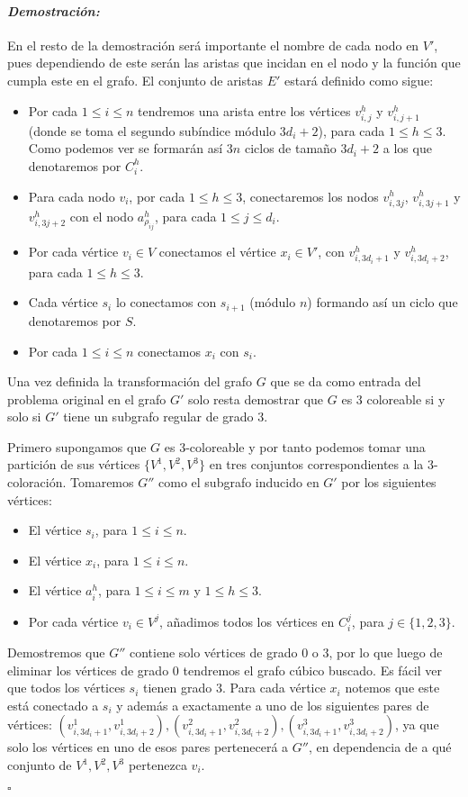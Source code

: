 \documentclass[10pt]{amsart}
\theoremstyle{definition}
\numberwithin{equation}{section}
\newenvironment{myproof} {\paragraph{\emph{Demostraci\'on:}}}{\hfill$\square$}
\begin{document}
\begin{myproof}
	En el resto de la demostraci\'on ser\'a importante el nombre de cada nodo en $V'$, pues dependiendo de este ser\'an las aristas que incidan en el nodo y la funci\'on que cumpla este en el grafo.  El conjunto de aristas $E'$ estar\'a definido como sigue:
	\begin{itemize}
		\item Por cada $1 \le i \le n$ tendremos una arista entre los v\'ertices $v_{i,j}^h$ y $v_{i,j+1}^h$ (donde se toma el segundo sub\'indice m\'odulo $3d_i + 2$), para cada $1 \le h \le 3$. Como podemos ver se formar\'an as\'i $3n$ ciclos de tama\~no $3d_i + 2$ a los que denotaremos por $C_i^h$.
		\item Para cada nodo $v_i$, por cada  $1 \le h \le 3$, conectaremos los nodos $v_{i,3j}^h$, $v_{i,3j + 1}^h$ y $v_{i,3j + 2}^h$ con el nodo  $a_{\rho_{ij}}^h$, para cada $1 \le j \le d_i$.
		\item Por cada v\'ertice $v_i \in V$ conectamos el v\'ertice $x_i \in V'$, con $v_{i,3d_i + 1}^h$ y  $v_{i,3d_i + 2}^h$, para cada $1 \le h \le 3$.
		\item Cada v\'ertice $s_i$ lo conectamos con $s_{i+1}$ (m\'odulo $n$) formando as\'i un ciclo que denotaremos por $S$.
		\item Por cada $1 \le i \le n$ conectamos $x_i$ con $s_i$. 
	\end{itemize}

	Una vez definida la transformaci\'on del grafo $G$ que se da como entrada del problema original en el grafo $G'$ solo resta demostrar que $G$ es $3$ coloreable si y solo si $G'$ tiene un subgrafo regular de grado $3$.
	
	Primero supongamos que $G$ es $3$-coloreable y por tanto podemos tomar una  partici\'on de sus v\'ertices $\{V^1, V^2, V^3 \}$ en tres conjuntos correspondientes a la $3$-coloraci\'on. Tomaremos $G''$ como el subgrafo inducido en $G'$ por los siguientes v\'ertices:
	\begin{itemize}
		\item El v\'ertice $s_i$, para $1 \le i \le n$.
		\item El v\'ertice $x_i$, para $1 \le i \le n$.
		\item El v\'ertice $a_i^h$, para $1 \le i \le m $ y $1 \le h \le 3$.
		\item Por cada v\'ertice $v_i \in V^j$, a\~nadimos todos los v\'ertices en $C_i^j$, para $j \in \{1,2,3\}$.
	\end{itemize}

	Demostremos que $G''$ contiene solo v\'ertices de grado $0$ o $3$, por lo que luego de eliminar los v\'ertices de grado $0$ tendremos el grafo c\'ubico buscado. Es f\'acil ver que todos los v\'ertices $s_i$ tienen grado $3$. Para cada v\'ertice $x_i$ notemos que este est\'a conectado a $s_i$ y adem\'as a exactamente a uno de los siguientes pares de v\'ertices: $(v_{i,3d_i + 1}^1, v_{i,3d_i + 2}^1), (v_{i,3d_i + 1}^2, v_{i,3d_i + 2}^2), (v_{i,3d_i + 1}^3, v_{i,3d_i + 2}^3)$, ya que solo los v\'ertices en uno de esos pares pertenecer\'a a $G''$, en dependencia de a qu\'e conjunto de $V^1, V^2, V^3$ pertenezca $v_i$. 
	

\end{myproof}
\end{document}
